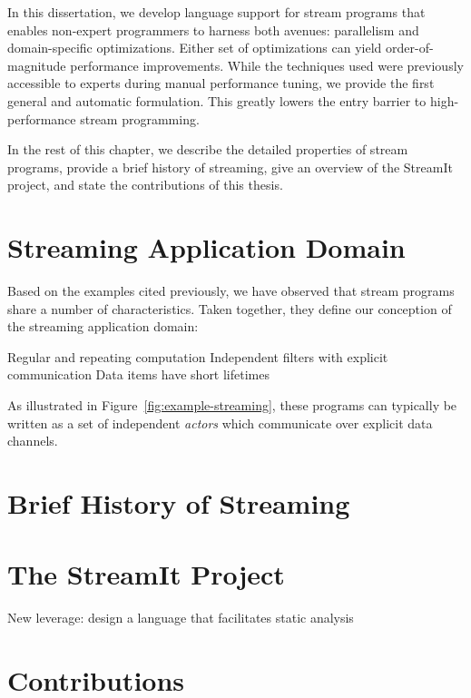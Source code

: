 

In this dissertation, we develop language support for stream programs
that enables non-expert programmers to harness both avenues:
parallelism and domain-specific optimizations.  Either set of
optimizations can yield order-of-magnitude performance improvements.
While the techniques used were previously accessible to experts during
manual performance tuning, we provide the first general and automatic
formulation.  This greatly lowers the entry barrier to
high-performance stream programming.


In the rest of this chapter, we describe the detailed properties of
stream programs, provide a brief history of streaming, give an
overview of the StreamIt project, and state the contributions of this
thesis.

\section{Streaming Application Domain}

Based on the examples cited previously, we have observed that stream
programs share a number of characteristics.  Taken together, they
define our conception of the streaming application domain:

Regular and repeating computation
Independent filters with explicit communication
Data items have short lifetimes

As illustrated in Figure~\ref{fig:example-streaming}, these programs
can typically be written as a set of independent {\it actors} which
communicate over explicit data channels.  

\section{Brief History of Streaming}

\section{The StreamIt Project}

New leverage: design a language that facilitates static analysis

\section{Contributions}
